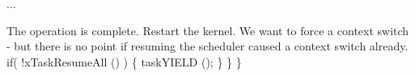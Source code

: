 \begin{DoxyPre}...\end{DoxyPre}



\begin{DoxyPre}The operation is complete.  Restart the kernel.  We want to force
a context switch - but there is no point if resuming the scheduler
caused a context switch already.
         if( !xTaskResumeAll () )
         \{
              taskYIELD ();
         \}
     \}
 \}
   \end{DoxyPre}
 